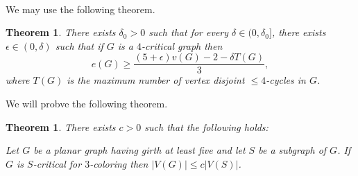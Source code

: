 \documentclass[letterpaper,12pt,oneside,onecolumn]{article}
\newtheorem{theorem}[fact]{Theorem}
\begin{document}
\paragraph{}
We may use the following theorem.
\begin{theorem}\label{th:four}
	There exists $\delta_0 >0$ such that for every $\delta \in (0,\delta_0]$, there exists $\epsilon \in (0,\delta)$ such that if $G$ is a $4$-critical graph then
	$$e(G) \geq \frac{(5+\epsilon)v(G) - 2 - \delta T(G)}{3},$$
	where $T(G)$ is the maximum number of vertex disjoint $\leq 4$-cycles in $G$.
\end{theorem}
We will probve the following theorem.
\begin{theorem}
	There exists $c>0$ such that the following holds:
	
	Let $G$ be a planar graph having girth at least five and let $S$ be a subgraph of $G$. If $G$ is $S$-critical for $3$-coloring then $|V(G)| \leq c|V(S)|$.
\end{theorem}
\end{document}
